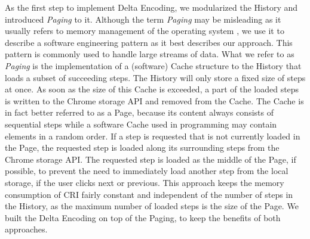 As the first step to implement Delta Encoding, we modularized the History and introduced \emph{Paging} to it. Although the term \emph{Paging} may be misleading as it usually refers to memory management of the operating system \cite{PagingWiki}, we use it to describe a software engineering pattern as it best describes our approach. This pattern is commonly used to handle large streams of data. What we refer to as \emph{Paging} is the implementation of a (software) Cache structure to the History that loads a subset of succeeding steps. The History will only store a fixed size of steps at once. As soon as the size of this Cache is exceeded, a part of the loaded steps is written to the Chrome storage API and removed from the Cache. The Cache is in fact better referred to as a Page, because its content always consists of sequential steps while a software Cache used in programming may contain elements in a random order. If a step is requested that is not currently loaded in the Page, the requested step is loaded along its surrounding steps from the Chrome storage API. The requested step is loaded as the middle of the Page, if possible, to prevent the need to immediately load another step from the local storage, if the user clicks next or previous. This approach keeps the memory consumption of CRI fairly constant and independent of the number of steps in the History, as the maximum number of loaded steps is the size of the Page. We built the Delta Encoding on top of the Paging, to keep the benefits of both approaches.
